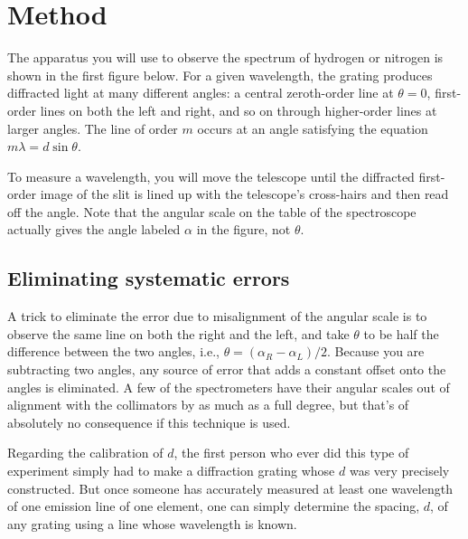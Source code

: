 \section*{Method}

The apparatus you will use to observe the spectrum of
hydrogen or nitrogen is shown in the first figure below. For a given wavelength, the
grating produces diffracted light at many different angles:
a central zeroth-order line at $\theta=0$, first-order lines on
both the left and right, and so on through higher-order
lines at larger angles.  The line of order $m$ occurs at an
angle satisfying the equation $m\lambda=d\sin\theta$.

To measure a wavelength, you will move the telescope until
the diffracted first-order image of the slit is lined up
with the telescope's cross-hairs and then read off the
angle. Note that the angular scale on the table of the
spectroscope actually gives the angle labeled $\alpha$ in
the figure, not $\theta$.

\subsection*{Eliminating systematic errors}

A trick to eliminate the error due to 
misalignment of the angular scale is to observe the same line on both the
right and the left, and take $\theta$ to be half the difference
between the two angles, i.e., $\theta=(\alpha_R-\alpha_L)/2$.
Because you are subtracting two angles, any source of error
that adds a constant offset onto the angles is eliminated.
A few of the spectrometers have their angular scales out of alignment
with the collimators by as much as a full degree, but that's of
absolutely no consequence if this technique is used.

Regarding the calibration of $d$, 
the first person who ever did this type of experiment simply
had to make a diffraction grating whose $d$ was very precisely
constructed. But once someone
has accurately measured at least one wavelength of one
emission line of one element, one can simply
determine the spacing, $d$, of any grating using a line
whose wavelength is known.
